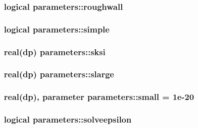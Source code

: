 \hypertarget{classparameters_a9635e00c308c351a86a27e749d8de6a4}{
\subsubsection[{roughwall}]{\setlength{\rightskip}{0pt plus 5cm}logical parameters\-::roughwall}}\label{classparameters_a9635e00c308c351a86a27e749d8de6a4}
\hypertarget{classparameters_ac3884668f4f779949ded0df3b287ff1e}{
\subsubsection[{simple}]{\setlength{\rightskip}{0pt plus 5cm}logical parameters\-::simple}}\label{classparameters_ac3884668f4f779949ded0df3b287ff1e}
\hypertarget{classparameters_a3fe998691eba6bebbcf6db7bea98e04f}{
\subsubsection[{sksi}]{\setlength{\rightskip}{0pt plus 5cm}real(dp) parameters\-::sksi}}\label{classparameters_a3fe998691eba6bebbcf6db7bea98e04f}
\hypertarget{classparameters_a9c9d4651cc7b174f44d61b794645fde0}{
\subsubsection[{slarge}]{\setlength{\rightskip}{0pt plus 5cm}real(dp) parameters\-::slarge}}\label{classparameters_a9c9d4651cc7b174f44d61b794645fde0}
\hypertarget{classparameters_ad6b372045d519a445dc3962d56b6da22}{
\subsubsection[{small}]{\setlength{\rightskip}{0pt plus 5cm}real(dp), parameter parameters\-::small = 1e-\/20}}\label{classparameters_ad6b372045d519a445dc3962d56b6da22}
\hypertarget{classparameters_ad3189fd9cd3944a959b2b64836e68ddf}{
\subsubsection[{solveepsilon}]{\setlength{\rightskip}{0pt plus 5cm}logical parameters\-::solveepsilon}}\label{classparameters_ad3189fd9cd3944a959b2b64836e68ddf}
